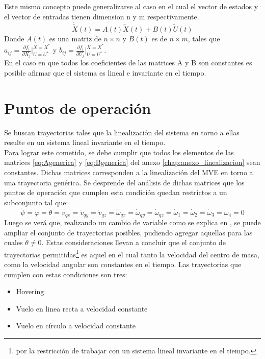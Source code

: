 \documentclass[main]{subfiles}
\begin{document}
Este mismo concepto puede generalizarse al caso en el cual el vector de estados y el vector de entradas tienen dimension n y m respectivamente.
\begin{equation}
\dot{\tilde{X}}(t)=A(t)\tilde{X}(t)+B(t)\tilde{U}(t)
\end{equation}
Donde $A(t)$ es una matriz de $n \times n$ y $B(t)$ es de $n \times m$, tales que $a_{ij}= \frac{\partial f_i}{\partial X_j}\vert_{U=U^*}^{X=X^*}$ y  $b_{ij}= \frac{\partial f_i}{\partial U_j}\vert_{U=U^*}^{X=X^*}$.\\

En el caso en que todos los coeficientes de las matrices A y B son constantes es posible afirmar que el sistema es lineal e invariante en el tiempo. 

\section{Puntos de operaci\'on}
Se buscan trayectorias tales que la linealizaci\'on del sistema en torno a ellas resulte en un sistema lineal invariante en el tiempo.\\

Para lograr este cometido, se debe cumplir que todos los elementos de las matrices \ref{eq:Agenerica} y \ref{eq:Bgenerica} del anexo \ref{chap:anexo_linealizacion} sean constantes. Dichas matrices corresponden a la linealizaci\'on del MVE en torno a una trayectoria gen\'erica. Se desprende del an\'alisis de dichas matrices que los puntos de operaci\'on que cumplen esta condici\'on quedan restrictos a un subconjunto tal que:
\begin{equation}
\dot{\psi}=\dot{\varphi}=\dot{\theta}=\dot{v}_{qx}=\dot{v}_{qy}=\dot{v}_{qz}=\dot{\omega}_{qx}=\dot{\omega}_{qy}=\dot{\omega}_{qz}=\dot{\omega}_1=\dot{\omega}_2=\dot{\omega}_3=\dot{\omega}_4=0
\end{equation}
Luego se ver\'a que, realizando un cambio de variable como se explica en \cite{bib:auion}, se puede ampliar el conjunto de trayectorias posibles, pudiendo agregar aquellas para las cuales $\dot{\theta} \neq 0$. Estas consideraciones llevan a concluir que el conjunto de trayectorias permitidas\footnote{por la restricci\'on de trabajar con un sistema lineal invariante en el tiempo.} es aquel en el cual tanto la velocidad del centro de masa, como la velocidad angular son constantes en el tiempo. Las trayectorias que cumplen con estas condiciones son tres:

\begin{itemize}
\item Hovering
\item Vuelo en linea recta a velocidad constante
\item Vuelo en c\'irculo a velocidad constante 
\end{itemize} 
\end{document}
